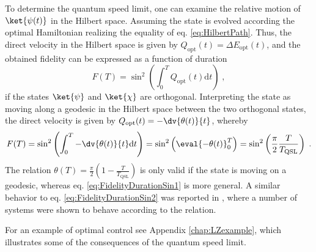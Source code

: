 To determine the quantum speed limit, one can examine the relative motion of $\ket{\psi (t)}$ in the Hilbert space. Assuming the state is evolved according the optimal Hamiltonian realizing the equality of eq. \eqref{eq:HilbertPath}. Thus, the direct velocity in the Hilbert space is given by $Q_{\mathrm{opt}} (t) = \Delta E_{\mathrm{opt}}(t)$, and the obtained fidelity can be expressed as a function of duration \cite{beyondQSL}
\begin{equation}
	F(T) = \sin ^2 \left( \int_{0}^{T} Q_{\mathrm{opt}} (t) \mathrm{d} t \right) \; ,
	\label{eq:FidelityDurationSin1}
\end{equation}  
if the states $\ket{\psi}$ and $\ket{\chi}$ are orthogonal. Interpreting the state as moving along a geodesic in the Hilbert space between the two orthogonal states, the direct velocity is given by $Q_{\mathrm{opt}} (t) =  -\dv{\theta (t)}{t}$, whereby
\begin{equation}
	F(T) = \sin ^2 \left( \int_{0}^{T} - \dv{\theta (t)}{t} \mathrm{d} t \right) =  \sin ^2 \left( \eval{ - \theta(t)}_{0}^{T} \right) = \sin ^2 \left( \frac{\pi}{2} \frac{T}{T_{\mathrm{QSL}}} \right) \; .
	\label{eq:FidelityDurationSin2}
\end{equation}  
The relation $\theta (T) = \frac{\pi}{2} \left( 1 -  \frac{T}{T_{\mathrm{QSL}}} \right)$ is only valid if the state is moving on a geodesic, whereas eq. \eqref{eq:FidelityDurationSin1} is more general. A similar behavior to eq. \eqref{eq:FidelityDurationSin2} was reported in \cite{Caneva2011}, where a number of systems were shown to behave according to the relation.

For an example of optimal control see Appendix \ref{chap:LZexample}, which illustrates some of the consequences of the quantum speed limit.

